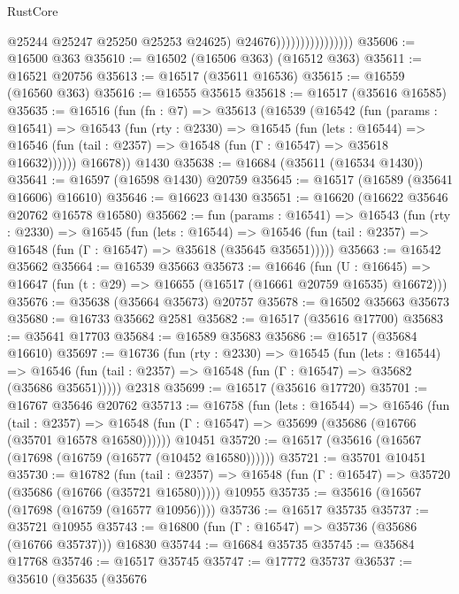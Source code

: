 \begin{lexlean}{RustCore}
\begin{coremodule}
                                      @25244
                                      @25247
                                      @25250
                                      @25253
                                      @24625)
                                    @24676))))))))))))))))
@35606 := @16500 @363
@35610 := @16502 (@16506 @363) (@16512 @363)
@35611 := @16521 @20756
@35613 := @16517 (@35611 @16536)
@35615 := @16559 (@16560 @363)
@35616 := @16555 @35615
@35618 := @16517 (@35616 @16585)
@35635 := @16516
    (fun (fn : @7) =>
    @35613
      (@16539
        (@16542
          (fun (params : @16541) =>
          @16543
            (fun (rty : @2330) =>
            @16545
              (fun (lets : @16544) =>
              @16546 (fun (tail : @2357) => @16548 (fun (Γ : @16547) => @35618 @16632))))))
        @16678))
    @1430
@35638 := @16684 (@35611 (@16534 @1430))
@35641 := @16597 (@16598 @1430) @20759
@35645 := @16517 (@16589 (@35641 @16606) @16610)
@35646 := @16623 @1430
@35651 := @16620 (@16622 @35646 @20762 @16578 @16580)
@35662 := fun (params : @16541) =>
  @16543
    (fun (rty : @2330) =>
    @16545
      (fun (lets : @16544) =>
      @16546 (fun (tail : @2357) => @16548 (fun (Γ : @16547) => @35618 (@35645 @35651)))))
@35663 := @16542 @35662
@35664 := @16539 @35663
@35673 := @16646
    (fun (U : @16645) => @16647 (fun (t : @29) => @16655 (@16517 (@16661 @20759 @16535) @16672)))
@35676 := @35638 (@35664 @35673) @20757
@35678 := @16502 @35663 @35673
@35680 := @16733 @35662 @2581
@35682 := @16517 (@35616 @17700)
@35683 := @35641 @17703
@35684 := @16589 @35683
@35686 := @16517 (@35684 @16610)
@35697 := @16736
    (fun (rty : @2330) =>
    @16545
      (fun (lets : @16544) =>
      @16546 (fun (tail : @2357) => @16548 (fun (Γ : @16547) => @35682 (@35686 @35651)))))
    @2318
@35699 := @16517 (@35616 @17720)
@35701 := @16767 @35646 @20762
@35713 := @16758
    (fun (lets : @16544) =>
    @16546
      (fun (tail : @2357) =>
      @16548 (fun (Γ : @16547) => @35699 (@35686 (@16766 (@35701 @16578 @16580))))))
    @10451
@35720 := @16517 (@35616 (@16567 (@17698 (@16759 (@16577 (@10452 @16580))))))
@35721 := @35701 @10451
@35730 := @16782
    (fun (tail : @2357) => @16548 (fun (Γ : @16547) => @35720 (@35686 (@16766 (@35721 @16580)))))
    @10955
@35735 := @35616 (@16567 (@17698 (@16759 (@16577 @10956))))
@35736 := @16517 @35735
@35737 := @35721 @10955
@35743 := @16800 (fun (Γ : @16547) => @35736 (@35686 (@16766 @35737))) @16830
@35744 := @16684 @35735
@35745 := @35684 @17768
@35746 := @16517 @35745
@35747 := @17772 @35737
@36537 := @35610
    (@35635
      (@35676

\end{coremodule}
\end{lexlean}
